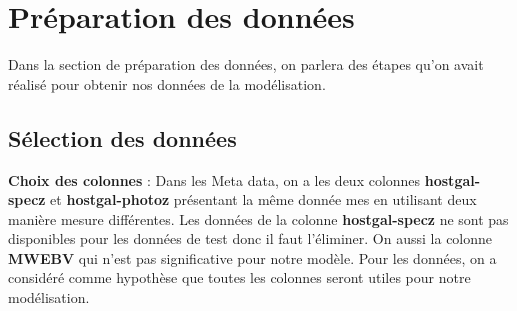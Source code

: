 \newpage
\subsection{}




















\section{Préparation des données}
Dans la section de préparation des données, on parlera des étapes qu’on avait réalisé pour obtenir nos données de la modélisation.
\subsection{Sélection des données}
\textbf{Choix des colonnes} : Dans les Meta data, on a les deux colonnes \textbf{hostgal-specz} et\textbf{ hostgal-photoz} présentant la même donnée mes en utilisant deux manière mesure différentes. Les données de la colonne \textbf{hostgal-specz} ne sont pas disponibles pour les données de test donc il faut l’éliminer. On aussi la colonne \textbf{MWEBV} qui n’est pas significative pour notre modèle. Pour les données, on a considéré comme hypothèse que toutes les colonnes seront utiles pour notre modélisation.
